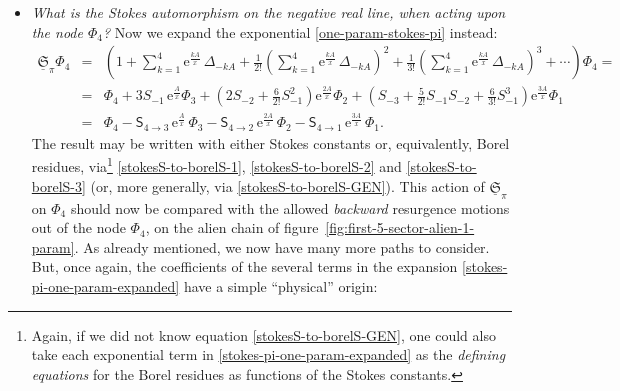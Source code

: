 \documentclass[11pt,a4paper]{article}
\newcommand{\rme}{{\mathrm{e}}}
\begin{document}
\begin{itemize}
%
\begin{itemize}
%
\item $\Phi_2\rightarrow\Phi_2$: this simply leaves the node invariant;
%
\item $\Phi_2\rightarrow\Phi_3$: there is a single path, of length $\ell=1$ and weight $w = 3 S_1$, leading to a combinatorial factor $\mathrm{CF}=\frac{1}{1!}$ and nonperturbative contribution $\rme^{-\frac{A}{x}}$;
%
\item $\Phi_2\rightarrow\Phi_4$: there is a single path (made of two steps), with length $\ell=2$ and weight $w = 12 \left( S_1 \right)^2$, leading to $\mathrm{CF}=\frac{1}{2!}$ and nonperturbative contribution $\rme^{-2\frac{A}{x}}$;
%
\item $\Phi_2\rightarrow\Phi_5$: again there is a single path (with three steps), of length $\ell=3$ and weight $w = 60 \left( S_1 \right)^3$, leading to $\mathrm{CF}=\frac{1}{3!}$ and nonperturbative contribution $\rme^{-3\frac{A}{x}}$.
%
\end{itemize}
%
\item \textit{What is the Stokes automorphism on the negative real line, when acting upon the node $\Phi_4$?} Now we expand the exponential \eqref{one-param-stokes-pi} instead:
%
\begin{eqnarray}
\underline{\mathfrak{S}}_{\pi} \Phi_4 &=& \left( 1 + \sum_{k=1}^4 \rme^{\frac{kA}{x}}\, \Delta_{-kA} + \frac{1}{2!} \left( \sum_{k=1}^4 \rme^{\frac{kA}{x}}\, \Delta_{-kA} \right)^2 + \frac{1}{3!} \left( \sum_{k=1}^4 \rme^{\frac{kA}{x}}\, \Delta_{-kA} \right)^3 + \cdots \right) \Phi_4 = \nonumber \\
&=&
\Phi_4 + 3 S_{-1}\, \rme^{\frac{A}{x}} \Phi_3 + \left( 2 S_{-2} + \frac{6}{2!} S_{-1}^2 \right) \rme^{\frac{2A}{x}} \Phi_2 + \left( S_{-3} + \frac{5}{2!} S_{-1} S_{-2} + \frac{6}{3!} S_{-1}^3 \right) \rme^{\frac{3A}{x}} \Phi_1 \nonumber \\
&=&
\Phi_4 - \mathsf{S}_{4\to3}\, \rme^{\frac{A}{x}}\, \Phi_3 - \mathsf{S}_{4\to2}\, \rme^{\frac{2A}{x}}\, \Phi_2 - \mathsf{S}_{4\to1}\, \rme^{\frac{3A}{x}}\, \Phi_1.
\label{stokes-pi-one-param-expanded}
\end{eqnarray}
%
\noindent
The result may be written with either Stokes constants or, equivalently, Borel residues, via\footnote{Again, if we did not know equation \eqref{stokesS-to-borelS-GEN}, one could also take each exponential term in \eqref{stokes-pi-one-param-expanded} as the \textit{defining equations} for the Borel residues as functions of the Stokes constants.} \eqref{stokesS-to-borelS-1}, \eqref{stokesS-to-borelS-2} and \eqref{stokesS-to-borelS-3} (or, more generally, via \eqref{stokesS-to-borelS-GEN}). This action of $\underline{\mathfrak{S}}_{\pi}$ on $\Phi_4$ should now be compared with the allowed \textit{backward} resurgence motions out of the node $\Phi_4$, on the alien chain of figure~\ref{fig:first-5-sector-alien-1-param}. As already mentioned, we now have many more paths to consider. But, once again, the coefficients of the several terms in the expansion \eqref{stokes-pi-one-param-expanded} have a simple ``physical'' origin:

\end{itemize}
\end{document}
